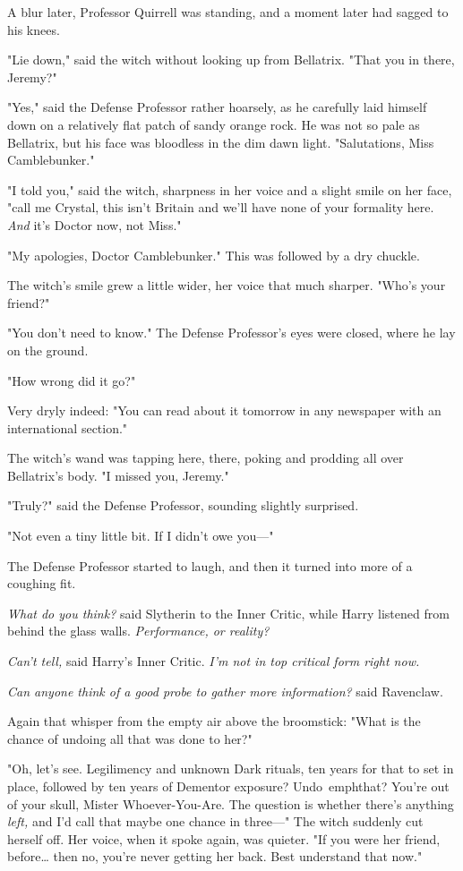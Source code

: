 A blur later, Professor Quirrell was standing, and a moment later had sagged to 
his knees.

"Lie down," said the witch without looking up from Bellatrix. "That you in 
there, Jeremy?"

"Yes," said the Defense Professor rather hoarsely, as he carefully laid himself 
down on a relatively flat patch of sandy orange rock. He was not so pale as 
Bellatrix, but his face was bloodless in the dim dawn light. "Salutations, Miss 
Camblebunker."

"I told you," said the witch, sharpness in her voice and a slight smile on her 
face, "call me Crystal, this isn't Britain and we'll have none of your 
formality here. \emph{And} it's Doctor now, not Miss."

"My apologies, Doctor Camblebunker." This was followed by a dry chuckle.

The witch's smile grew a little wider, her voice that much sharper. "Who's your 
friend?"

"You don't need to know." The Defense Professor's eyes were closed, where he 
lay on the ground.

"How wrong did it go?"

Very dryly indeed: "You can read about it tomorrow in any newspaper with an 
international section."

The witch's wand was tapping here, there, poking and prodding all over 
Bellatrix's body. "I missed you, Jeremy."

"Truly?" said the Defense Professor, sounding slightly surprised.

"Not even a tiny little bit. If I didn't owe you---"

The Defense Professor started to laugh, and then it turned into more of a 
coughing fit.

\emph{What do you think?} said Slytherin to the Inner Critic, while Harry 
listened from behind the glass walls. \emph{Performance, or reality?}

\emph{Can't tell,} said Harry's Inner Critic. \emph{I'm not in top critical 
form right now.}

\emph{Can anyone think of a good probe to gather more information?} said 
Ravenclaw.

Again that whisper from the empty air above the broomstick: "What is the chance 
of undoing all that was done to her?"

"Oh, let's see. Legilimency and unknown Dark rituals, ten years for that to set 
in place, followed by ten years of Dementor exposure? Undo\ emph{that?} You're 
out of your skull, Mister Whoever-You-Are. The question is whether there's 
anything \emph{left,} and I'd call that maybe one chance in three---" The witch 
suddenly cut herself off. Her voice, when it spoke again, was quieter. "If you 
were her friend, before{\ldots} then no, you're never getting her back. Best 
understand that now."

